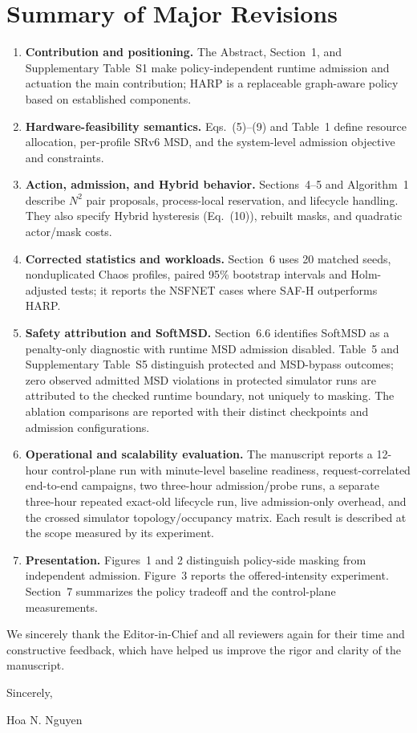 \documentclass[11pt]{article}
\newcounter{reviewer}
\begin{document}
\section*{Summary of Major Revisions}
{\color{replyblue}
\begin{enumerate}
\item \textbf{Contribution and positioning.} The Abstract, Section~1, and Supplementary Table~S1 make policy-independent runtime admission and actuation the main contribution; HARP is a replaceable graph-aware policy based on established components.

\item \textbf{Hardware-feasibility semantics.} Eqs.~(5)--(9) and Table~1 define resource allocation, per-profile SRv6 MSD, and the system-level admission objective and constraints.
\item \textbf{Action, admission, and Hybrid behavior.} Sections~4--5 and Algorithm~1 describe \(N^2\) pair proposals, process-local reservation, and lifecycle handling. They also specify Hybrid hysteresis (Eq.~(10)), rebuilt masks, and quadratic actor/mask costs.
\item \textbf{Corrected statistics and workloads.} Section~6 uses 20 matched seeds, nonduplicated Chaos profiles, paired 95\% bootstrap intervals and Holm-adjusted tests; it reports the NSFNET cases where SAF-H outperforms HARP.

\item \textbf{Safety attribution and SoftMSD.} Section~6.6 identifies SoftMSD as a penalty-only diagnostic with runtime MSD admission disabled. Table~5 and Supplementary Table~S5 distinguish protected and MSD-bypass outcomes; zero observed admitted MSD violations in protected simulator runs are attributed to the checked runtime boundary, not uniquely to masking. The ablation comparisons are reported with their distinct checkpoints and admission configurations.
\item \textbf{Operational and scalability evaluation.} The manuscript reports a 12-hour control-plane run with minute-level baseline readiness, request-correlated end-to-end campaigns, two three-hour admission/probe runs, a separate three-hour repeated exact-old lifecycle run, live admission-only overhead, and the crossed simulator topology/occupancy matrix. Each result is described at the scope measured by its experiment.
\item \textbf{Presentation.} Figures~1 and 2 distinguish policy-side masking from independent admission. Figure~3 reports the offered-intensity experiment. Section~7 summarizes the policy tradeoff and the control-plane measurements.
\end{enumerate}
}

We sincerely thank the Editor-in-Chief and all reviewers again for their time and constructive feedback, which have helped us improve the rigor and clarity of the manuscript.

\bigskip
Sincerely,

\vspace{2mm}
Hoa N. Nguyen
\end{document}
